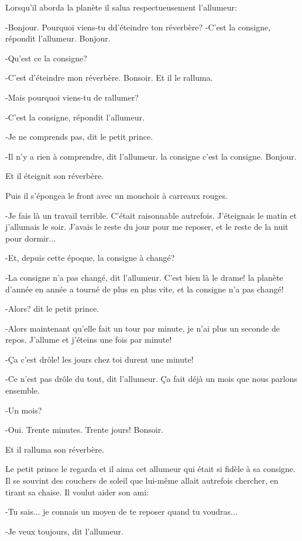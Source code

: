 \documentclass{report}
\begin{document}
Lorsqu'il aborda la planète il salua respectueusement l'allumeur:

-Bonjour. Pourquoi viens-tu dd'éteindre ton réverbère?
-C'est la consigne, répondit l'allumeur. Bonjour.

-Qu'est ce la consigne?

-C'est d'éteindre mon réverbère. Bonsoir.
Et il le ralluma.

-Mais pourquoi viens-tu de rallumer?

-C'est la consigne, répondit l'allumeur.

-Je ne comprends pas, dit le petit prince.

-Il n'y a rien à comprendre, dit l'allumeur. la consigne c'est la consigne. Bonjour.

Et il éteignit son réverbère.

Puis il s'épongea le front avec un mouchoir à carreaux rouges.

-Je fais là un travail terrible. C'était raisonnable autrefois. J'éteignais le matin et j'allumais le soir. J'avais le reste du jour pour me reposer, et le reste de la nuit pour dormir...

-Et, depuis cette époque, la consigne à changé?

-La consigne n'a pas changé, dit l'allumeur. C'est bien là le drame! la planète d'année en année a tourné de plus en plus vite, et la consigne n'a pas changé!

-Alors? dit le petit prince.

-Alors maintenant qu'elle fait un tour par minute, je n'ai plus un seconde de repos. J'allume et j'éteins une fois par minute!

-Ça c'est drôle! les jours chez toi durent une minute!

-Ce n'est pas drôle du tout, dit l'allumeur. Ça fait déjà un mois que nous parlons ensemble.

-Un mois?

-Oui. Trente minutes. Trente jours! Bonsoir.

Et il ralluma son réverbère.

Le petit prince le regarda et il aima cet allumeur qui était si fidèle à sa consigne. Il se souvint des couchers de soleil que lui-même allait autrefois chercher, en tirant sa chaise. Il voulut aider son ami:

-Tu sais... je connais un moyen de te reposer quand tu voudras...

-Je veux toujours, dit l'allumeur.
\end{document}
